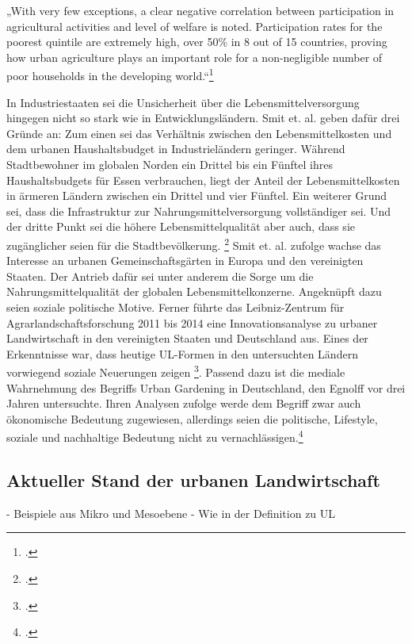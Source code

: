 \documentclass{scrartcl}
\begin{document}
\begin{displayquote}
„With very few exceptions, a clear negative correlation between participation in agricultural activities and level of welfare is noted. Participation rates for the poorest quintile are extremely high, over 50\% in 8 out of 15 countries, proving how urban agriculture plays an important role for a non-negligible number of poor households in the developing world.“\footcite[S.268]{Zezza2010UrbanCountries}
\end{displayquote}
In Industriestaaten sei die Unsicherheit über die Lebensmittelversorgung hingegen nicht so stark wie in Entwicklungsländern. Smit et. al. geben dafür drei Gründe an: Zum einen sei das Verhältnis zwischen den Lebensmittelkosten und dem urbanen Haushaltsbudget in Industrieländern geringer. Während Stadtbewohner im globalen Norden ein Drittel bis ein Fünftel ihres Haushaltsbudgets für Essen verbrauchen, liegt der Anteil der Lebensmittelkosten in ärmeren Ländern zwischen ein Drittel und vier Fünftel. Ein weiterer Grund sei, dass die Infrastruktur zur Nahrungsmittelversorgung vollständiger sei. Und der dritte Punkt sei die höhere Lebensmittelqualität aber auch, dass sie zugänglicher seien für die Stadtbevölkerung. \footcites[Vgl.][S.27]{SmitUrbanToday} Smit et. al. zufolge wachse das Interesse an urbanen Gemeinschaftsgärten in Europa und den vereinigten Staaten. Der Antrieb dafür sei unter anderem die Sorge um die Nahrungsmittelqualität der globalen Lebensmittelkonzerne. Angeknüpft dazu seien soziale politische Motive. Ferner führte das Leibniz-Zentrum für Agrarlandschaftsforschung 2011 bis 2014 eine Innovationsanalyse zu urbaner Landwirtschaft in den vereinigten Staaten und Deutschland aus. Eines der Erkenntnisse war, dass heutige UL-Formen in den untersuchten Ländern vorwiegend soziale Neuerungen zeigen \footcite{Berges2014UrbaneStadt}. Passend dazu ist die mediale Wahrnehmung des Begriffs Urban Gardening in Deutschland, den Egnolff vor drei Jahren untersuchte. Ihren Analysen zufolge werde dem Begriff zwar auch ökonomische Bedeutung zugewiesen, allerdings seien die politische, Lifestyle, soziale und nachhaltige Bedeutung nicht zu vernachlässigen.\footcite[Vgl.][S.119ff]{Egnolff2015DieIdeal}



\subsection{Aktueller Stand der urbanen Landwirtschaft}
- Beispiele aus Mikro und Mesoebene 
- Wie in der Definition zu UL 
\end{document}
